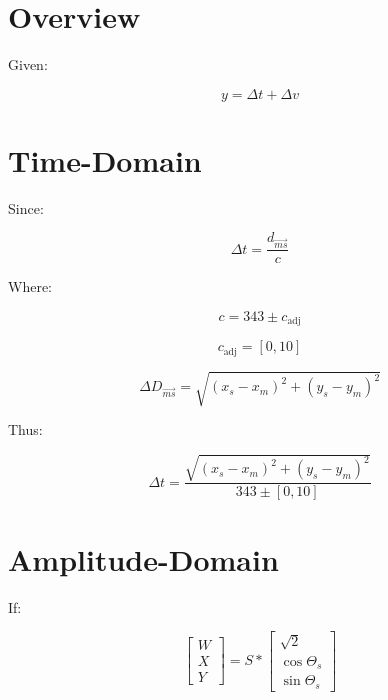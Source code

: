 \documentclass[fleqn]{IEEEtran}
\begin{document}
\section{Overview}

	Given:

	\begin{equation}
		y = \Delta{}t + \Delta{}v
	\end{equation}
	
\section{Time-Domain}

	Since:

	\begin{equation}
		\Delta{}t = \frac{d_{\vec{ms}}}{c}
	\end{equation}
	
	Where:

	\begin{equation}
		c = 343 \pm c_{\text{adj}}
	\end{equation}
	
	\begin{equation}
		c_{\text{adj}} = [0, 10]
	\end{equation}
	
	\begin{equation}
		\Delta{}D_{\vec{ms}} = \sqrt{(x_s - x_m)^2 + (y_s - y_m)^2}
	\end{equation}
	
	Thus:
	
	\begin{equation}
		\Delta{}t = \frac{
			\sqrt{(x_s - x_m)^2 + (y_s - y_m)^2}
			}
			{
			343 \pm [0,10]
			}
	\end{equation}
	
\section{Amplitude-Domain}
	
	If:

	\begin{equation}
		\begin{bmatrix} W \\ X \\ Y \end{bmatrix} = S *  \begin{bmatrix} \sqrt{2} \\ \cos{\Theta{}_s}\\ \sin{\Theta{}_s} \end{bmatrix}
	\end{equation}
	
\end{document}
